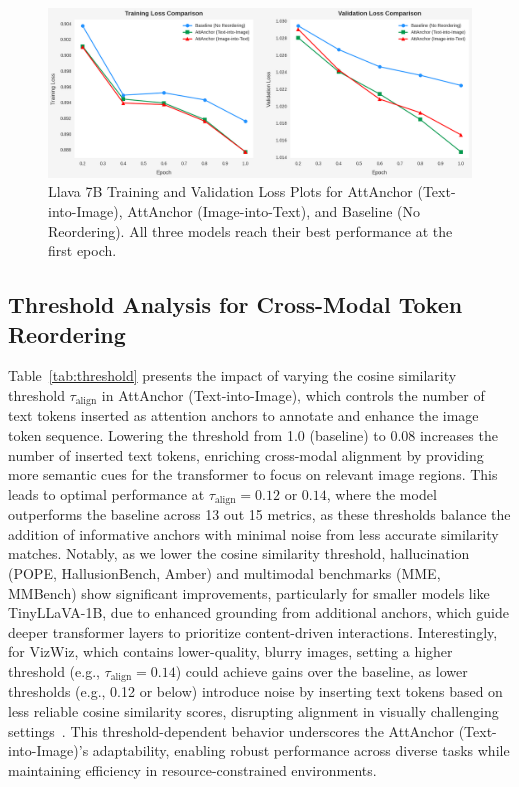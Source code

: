 \documentclass[11pt]{article}
\begin{document}
\begin{figure}[H]
    \centering
    \includegraphics[width=0.9\linewidth]{iclr2026/lossCompare.png}
    \caption{Llava 7B Training and Validation Loss Plots for AttAnchor (Text-into-Image), AttAnchor (Image-into-Text), and Baseline (No Reordering). All three models reach their best performance at the first epoch.}
    \label{fig:loss_plot}
\end{figure}

\subsection{Threshold Analysis for Cross-Modal Token Reordering}
Table~\ref{tab:threshold} presents the impact of varying the cosine similarity threshold $\tau_{\text{align}}$ in AttAnchor (Text-into-Image), which controls the number of text tokens inserted as attention anchors to annotate and enhance the image token sequence. Lowering the threshold from 1.0 (baseline) to 0.08 increases the number of inserted text tokens, enriching cross-modal alignment by providing more semantic cues for the transformer to focus on relevant image regions. This leads to optimal performance at $\tau_{\text{align}} = 0.12$ or $0.14$, where the model outperforms the baseline across 13 out 15 metrics, as these thresholds balance the addition of informative anchors with minimal noise from less accurate similarity matches. Notably, as we lower the cosine similarity threshold, hallucination (POPE, HallusionBench, Amber) and multimodal benchmarks (MME, MMBench) show significant improvements, particularly for smaller models like TinyLLaVA-1B, due to enhanced grounding from additional anchors, which guide deeper transformer layers to prioritize content-driven interactions. Interestingly, for VizWiz, which contains lower-quality, blurry images, setting a higher threshold (e.g., $\tau_{\text{align}} = 0.14$) could achieve gains over the baseline, as lower thresholds (e.g., 0.12 or below) introduce noise by inserting text tokens based on less reliable cosine similarity scores, disrupting alignment in visually challenging settings~\citep{gurari2018vizwiz}. This threshold-dependent behavior underscores the AttAnchor (Text-into-Image)’s adaptability, enabling robust performance across diverse tasks while maintaining efficiency in resource-constrained environments.
\end{document}
